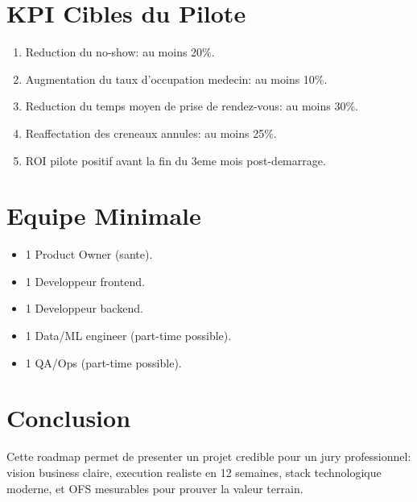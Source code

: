 \documentclass[11pt,a4paper]{article}
\begin{document}
\section*{KPI Cibles du Pilote}
\begin{enumerate}[leftmargin=*]
  \item Reduction du no-show: au moins 20\%.
  \item Augmentation du taux d'occupation medecin: au moins 10\%.
  \item Reduction du temps moyen de prise de rendez-vous: au moins 30\%.
  \item Reaffectation des creneaux annules: au moins 25\%.
  \item ROI pilote positif avant la fin du 3eme mois post-demarrage.
\end{enumerate}

\section*{Equipe Minimale}
\begin{itemize}[leftmargin=*]
  \item 1 Product Owner (sante).
  \item 1 Developpeur frontend.
  \item 1 Developpeur backend.
  \item 1 Data/ML engineer (part-time possible).
  \item 1 QA/Ops (part-time possible).
\end{itemize}

\section*{Conclusion}
Cette roadmap permet de presenter un projet credible pour un jury professionnel:
vision business claire, execution realiste en 12 semaines, stack technologique moderne,
et OFS mesurables pour prouver la valeur terrain.
\end{document}
